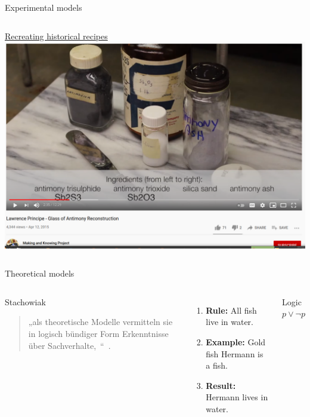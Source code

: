 \begin{frame}[allowframebreaks]{Experimental models}
\begin{columns}
    \begin{block}{}
        \href{https://www.youtube.com/watch?v=2vS4aPQI80M}{Recreating historical recipes}
    \includegraphics[width=\textwidth]{img/glass-of-antimony-experiment.png}
    
    \end{block}
    \end{columns}
    
\end{frame}

\begin{frame}{Theoretical models}
  \begin{columns}%
    \begin{block}{Stachowiak}
        \begin{quote}
            „\punkti als theoretische Modelle vermitteln sie in logisch bündiger Form Erkenntnisse über Sachverhalte,~\punkti“~\parencite[139]{stachowiak}.
        \end{quote}
    \end{block}

    \bigskip
    
    \begin{enumerate}
        \item \textbf{Rule:} All fish live in water.
        \item \textbf{Example:} Gold fish Hermann is a fish.
        \item \textbf{Result:} Hermann lives in water.
    \end{enumerate}
    \bigskip
    
    \begin{block}{Logic}
    $p \lor \neg p$
    \end{block}

  \end{columns}
\end{frame}

